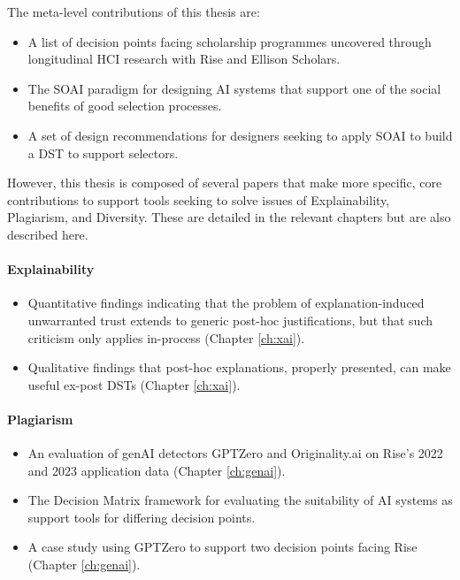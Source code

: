 The meta-level contributions of this thesis are:

\begin{itemize}
    \item A list of decision points facing scholarship programmes uncovered through longitudinal HCI research with Rise and Ellison Scholars.
    \item The SOAI paradigm for designing AI systems that support one of the social benefits of good selection processes.
    \item A set of design recommendations for designers seeking to apply SOAI to build a DST to support selectors.
\end{itemize}

However, this thesis is composed of several papers that make more specific, core contributions to support tools seeking to solve issues of Explainability, Plagiarism, and Diversity. These are detailed in the relevant chapters but are also described here.

\paragraph{Explainability}
\begin{itemize}
    \item Quantitative findings indicating that the problem of explanation-induced unwarranted trust extends to generic post-hoc justifications, but that such criticism only applies in-process (Chapter \ref{ch:xai}).
    \item Qualitative findings that post-hoc explanations, properly presented, can make useful ex-post DSTs (Chapter \ref{ch:xai}).
\end{itemize}

\paragraph{Plagiarism}
\begin{itemize}
    \item An evaluation of genAI detectors GPTZero and Originality.ai on Rise's 2022 and 2023 application data (Chapter \ref{ch:genai}).
    \item The Decision Matrix framework for evaluating the suitability of AI systems as support tools for differing decision points.
    \item A case study using GPTZero to support two decision points facing Rise (Chapter \ref{ch:genai}).
\end{itemize}

